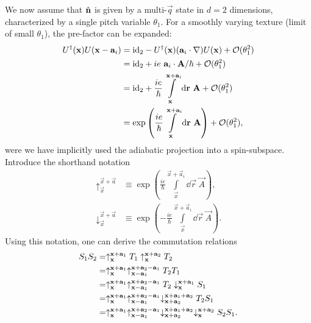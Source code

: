 \documentclass[
    10pt,
    aps,
    prb,
	longbibliography,
    twocolumn,
    floatfix,
    superscriptaddress,
]{revtex4-2}
\begin{document}
We now assume that $\hatn$ is given by a multi-$\vec{q}$ state in $d=2$ dimensions, characterized by a single pitch variable $\theta_1$.
For a smoothly varying texture (limit of small $\theta_1$), the pre-factor can be expanded:
\begin{align}
	U^\dagger ( \vec{x}) U( \vec{x} - \vec{a}_i) 
	& = \id_2
	- U^\dagger ( \vec{x})( \vec{a}_i \cdot \nabla) U( \vec{x} ) + \mathcal{O}(\theta_1^2)
	\notag \\
	& = \id_2
	+ i  e~\vec{a}_i  \cdot \vec{A} / \hbar + \mathcal{O}(\theta_1^2)
	\notag \\
	& = \id_2
	+ \frac{i e}{\hbar} \int\limits_{\vec{x}}^{\vec{x}+\vec{a}_i} \dd\vec{r}~\vec{A}  + \mathcal{O}(\theta_1^2) 
	\notag \\
	& = \exp\left( \frac{i e}{\hbar} \int\limits_{\vec{x}}^{\vec{x}+\vec{a}_i} \dd\vec{r}~\vec{A} \right) + \mathcal{O}(\theta_1^2) ,
\end{align}
were we have implicitly used the adiabatic projection into a spin-subspace.
Introduce the shorthand notation
\begin{align}
	\uparrow_{\vec{x}}^{\vec{x}+\vec{a} } &\equiv \exp\left( \frac{i e}{\hbar} \int\limits_{\vec{x}}^{\vec{x}+\vec{a}_i} \dd\vec{r}~\vec{A} \right) ,
	\\
	\downarrow_{\vec{x}}^{\vec{x}+\vec{a} } &\equiv \exp\left( -\frac{i e}{\hbar} \int\limits_{\vec{x}}^{\vec{x}+\vec{a}_i} \dd\vec{r}~\vec{A} \right) .
\end{align}
Using this notation, one can derive the commutation relations
\begin{align}
	S_1 S_2 &=
	\uparrow_{\vec{x}}^{\vec{x}+\vec{a}_1 } T_1 \uparrow_{\vec{x}}^{\vec{x}+\vec{a}_2 } T_2 
	\notag \\
	&=
	\uparrow_{\vec{x}}^{\vec{x}+\vec{a}_1 } \uparrow_{\vec{x}-\vec{a}_1}^{\vec{x}+\vec{a}_2 -\vec{a}_1} T_2  T_1
	\notag \\
	&=
	\uparrow_{\vec{x}}^{\vec{x}+\vec{a}_1 } \uparrow_{\vec{x}-\vec{a}_1}^{\vec{x}+\vec{a}_2 -\vec{a}_1} T_2 \downarrow_{\vec{x}}^{\vec{x}+\vec{a}_1 } S_1
	\notag \\
	&=
	\uparrow_{\vec{x}}^{\vec{x}+\vec{a}_1 } \uparrow_{\vec{x}-\vec{a}_1}^{\vec{x}+\vec{a}_2 -\vec{a}_1} \downarrow_{\vec{x}+\vec{a}_2}^{\vec{x}+\vec{a}_1+\vec{a}_2 }T_2  S_1
	\notag \\
	&=
	\uparrow_{\vec{x}}^{\vec{x}+\vec{a}_1 } \uparrow_{\vec{x}-\vec{a}_1}^{\vec{x}+\vec{a}_2 -\vec{a}_1} \downarrow_{\vec{x}+\vec{a}_2}^{\vec{x}+\vec{a}_1+\vec{a}_2 }
	\downarrow_{\vec{x}}^{\vec{x}+\vec{a}_2 }
	S_2  S_1 .
\end{align}
\end{document}
